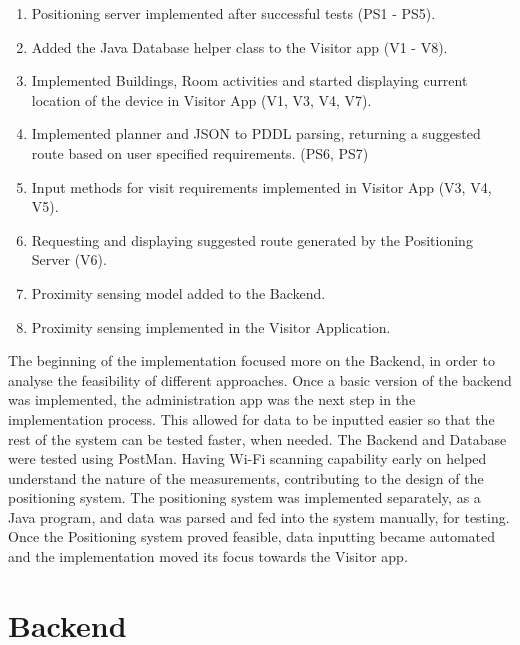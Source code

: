 \begin{enumerate}
	\item Positioning server implemented after successful tests (PS1 - PS5).
	\item Added the Java Database helper class to the Visitor app (V1 - V8).
	\item Implemented Buildings, Room activities and started displaying current location of the device in Visitor App (V1, V3, V4, V7).	
	\item Implemented planner and JSON to PDDL parsing, returning a suggested route based on user specified requirements. (PS6, PS7)
	\item Input methods for visit requirements implemented in Visitor App (V3, V4, V5).
	\item Requesting and displaying suggested route generated by the Positioning Server (V6).
	\item Proximity sensing model added to the Backend.
	\item Proximity sensing implemented in the Visitor Application.
\end{enumerate}
The beginning of the implementation focused more on the Backend, in order to analyse the feasibility of different approaches. Once a basic version of the backend was implemented, the administration app was the next step in the implementation process. This allowed for data to be inputted easier so that the rest of the system can be tested faster, when needed. The Backend and Database were tested using PostMan. Having Wi-Fi scanning capability early on helped understand the nature of the measurements, contributing to the design of the positioning system. The positioning system was implemented separately, as a Java program, and data was parsed and fed into the system manually, for testing. Once the Positioning system proved feasible, data inputting became automated and the implementation moved its focus towards the Visitor app.

\section{Backend}
